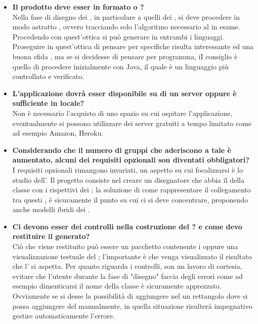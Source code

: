 \begin{itemize}
		   	 \item
	   	 \textbf{Il  prodotto deve esser in formato  o ?\\}
	   	 \justifying
	   	 Nella fase di disegno dei  , in particolare a quelli dei , si deve procedere in modo astratto , ovvero tracciando solo l'algoritmo necessario al  in esame. Procedendo con quest'ottica si può generare  in entrambi i linguaggi. Proseguire in quest'ottica di pensare per specifiche risulta interessante ed una buona sfida , ma se si decidesse di pensare per programma, iI consiglio è quello di procedere inizialmente con Java, il quale è un linguaggio più controllato e verificato.\\
		
		   	 \item
	   	 \textbf{L'applicazione dovrà esser disponibile su di un server oppure è sufficiente in locale?\\}
	   	\justifying
	   	 Non è necessario l'acquisto di uno spazio su cui ospitare l'applicazione, eventualmente si possono utilizzare dei server gratuiti a tempo limitato come ad esempio Amazon, Heroku.\\
		
		\item
	   	 \textbf{Considerando che il numero di gruppi che aderiscono a tale  è aumentato, alcuni dei requisiti opzionali son diventati obbligatori?\\}
	   	\justifying
	   	I requisiti opzionali rimangono invariati, un aspetto su cui focalizzarsi è lo studio dell'. Il progetto consiste nel creare un disegnatore che abbia il  della classe con i rispettivi  dei ; la soluzione di come rappresentare il collegamento tra questi , è sicuramente il punto su cui ci si deve concentrare, proponendo anche modelli ibridi dei .\\
	   	 
	   	 		\item
	   	 \textbf{Ci devono esser dei controlli nella costruzione del ? e come devo restituire il  generato? \\}
	   	\justifying
	   	 Ciò che viene restituito può essere un pacchetto contenente i  oppure una visualizzazione testuale del ; l'importante è che venga visualizzato il risultato che l' si aspetta. Per quanto riguarda i controlli, son un lavoro di cortesia, evitare che l'utente durante la fase di "disegno" faccia degli errori come ad esempio dimenticarsi il nome della classe è sicuramente apprezzato. Ovviamente se si desse la possibilità di aggiungere nel  un rettangolo dove si possa aggiungere del  manualmente, in quella situazione risulterà impegnativo gestire automaticamente l'errore. 
	   	 \end{itemize}
